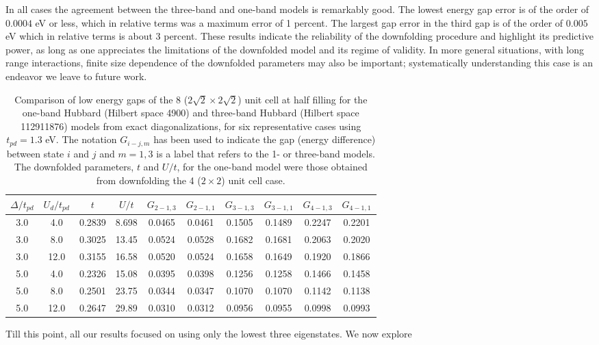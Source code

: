In all cases the agreement between the three-band and one-band models is remarkably good. 
The lowest energy gap error is of the order of $0.0004$ eV or less, which in relative terms was a maximum error 
of 1 percent. The largest gap error in the third gap is of the order of $0.005$ eV which in relative terms is about 3 percent. 
These results indicate the reliability of the downfolding procedure 
and highlight its predictive power, as long as one appreciates the limitations of the downfolded 
model and its regime of validity. In more general situations, with long range interactions, 
finite size dependence of the downfolded parameters may also be important; systematically understanding this case is 
an endeavor we leave to future work. 
\begin{table}
\centering
\begin{tabular}{c|c|c|c||c|c||c|c||c|c}
\hline
$\Delta/t_{pd}$ & $U_d/t_{pd}$ & $t$ & $U/t$ & $G_{2-1,3}$ & $G_{2-1,1}$ & $G_{3-1,3}$ & $G_{3-1,1}$ & $G_{4-1,3}$ & $G_{4-1,1}$  \\
\hline
\hline
3.0 & 4.0 &  0.2839 & 8.698 & 0.0465 & 0.0461 & 0.1505 & 0.1489 & 0.2247 & 0.2201  \\ 
3.0 & 8.0 &  0.3025 & 13.45 & 0.0524 & 0.0528 & 0.1682 & 0.1681 & 0.2063 & 0.2020  \\ 
3.0 & 12.0 & 0.3155 & 16.58 & 0.0520 & 0.0524 & 0.1658 & 0.1649 & 0.1920 & 0.1866  \\ 
5.0 & 4.0 &  0.2326 & 15.08 & 0.0395 & 0.0398 & 0.1256 & 0.1258 & 0.1466 & 0.1458  \\ 
5.0 & 8.0 &  0.2501 & 23.75 & 0.0344 & 0.0347 & 0.1070 & 0.1070 & 0.1142 & 0.1138  \\ 
5.0 & 12.0 & 0.2647 & 29.89 & 0.0310 & 0.0312 & 0.0956 & 0.0955 & 0.0998 & 0.0993  \\ 
\hline
\end{tabular}
\caption{Comparison of low energy gaps of the 8 ($2\sqrt{2} \times 2\sqrt{2}$) unit cell 
at half filling for the one-band Hubbard (Hilbert space 4900) and three-band Hubbard (Hilbert space 112911876) 
models from exact diagonalizations, for six representative cases using $t_{pd}=1.3 $ eV. The notation $G_{i-j,m}$ 
has been used to indicate the gap (energy difference) between state $i$ and $j$ and $m=1,3$ is a label that 
refers to the 1- or three-band models. 
The downfolded parameters, $t$ and $U/t$, for the one-band model were those obtained from downfolding the 4 ($2\times2$) unit cell 
case.}
\label{tab:predictivity}
\end{table} 
Till this point, all our results focused on using only the lowest three eigenstates. We now explore 
